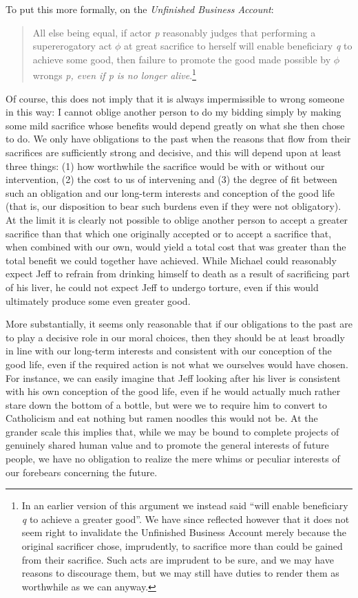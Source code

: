 \documentclass[man,11pt,a4paper]{apa7}
\begin{document}
To put this more formally, on the \textit{Unfinished Business Account}:

\begin{quote}
All else being equal, if actor \textit{p} reasonably judges that performing a supererogatory act \textit{$\phi$} at great sacrifice to herself will enable beneficiary \textit{q} to achieve some good, then failure to promote the good made possible by \textit{$\phi$} wrongs \textit{p, even if p is no longer alive}.\footnote{In an earlier version of this argument we instead said ``will enable beneficiary \textit{q} to achieve a greater good''. We have since reflected however that it does not seem right to invalidate the Unfinished Business Account merely because the original sacrificer chose, imprudently, to sacrifice more than could be gained from their sacrifice. Such acts are imprudent to be sure, and we may have reasons to discourage them, but we may still have duties to render them as worthwhile as we can anyway.}
\end{quote}

Of course, this does not imply that it is always impermissible to wrong someone in this way: I cannot oblige another person to do my bidding simply by making some mild sacrifice whose benefits would depend greatly on what she then chose to do. We only have obligations to the past when the reasons that flow from their sacrifices are sufficiently strong and decisive, and this will depend upon at least three things: (1) how worthwhile the sacrifice would be with or without our intervention, (2) the cost to us of intervening and (3) the degree of fit between such an obligation and our long-term interests and conception of the good life (that is, our disposition to bear such burdens even if they were not obligatory). At the limit it is clearly not possible to oblige another person to accept a greater sacrifice than that which one originally accepted or to accept a sacrifice that, when combined with our own, would yield a total cost that was greater than the total benefit we could together have achieved. While Michael could reasonably expect Jeff to refrain from drinking himself to death as a result of sacrificing part of his liver, he could not expect Jeff to undergo torture, even if this would ultimately produce some even greater good.

More substantially, it seems only reasonable that if our obligations to the past are to play a decisive role in our moral choices, then they should be at least broadly in line with our long-term interests and consistent with our conception of the good life, even if the required action is not what we ourselves would have chosen. For instance, we can easily imagine that Jeff looking after his liver is consistent with his own conception of the good life, even if he would actually much rather stare down the bottom of a bottle, but were we to require him to convert to Catholicism and eat nothing but ramen noodles this would not be. At the grander scale this implies that, while we may be bound to complete projects of genuinely shared human value and to promote the general interests of future people, we have no obligation to realize the mere whims or peculiar interests of our forebears concerning the future.
\end{document}
